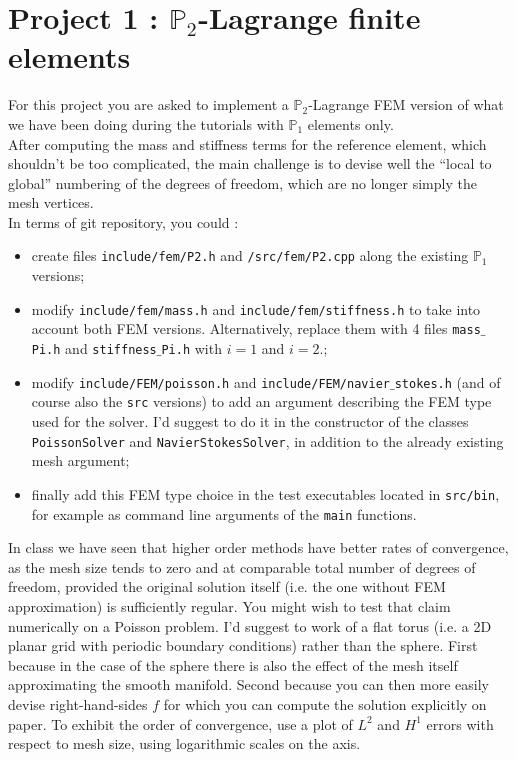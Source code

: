 \documentclass[11pt]{article}
\begin{document}
\pagebreak

\section*{Project 1 : $\mathbb{P}_2$-Lagrange finite elements}

For this project you are asked to implement a $\mathbb{P}_2$-Lagrange FEM version
of what we have been doing during the tutorials with $\mathbb{P}_1$ elements 
only.\\
After computing the mass and stiffness terms for the reference element, which
shouldn't be too complicated, the main challenge is to devise well the 
``local to global'' numbering of the degrees of freedom, which are no longer 
simply the mesh vertices.\\
In terms of git repository, you could : 
\begin{itemize}
\item create files {\tt include/fem/P2.h} and {\tt /src/fem/P2.cpp} along the
existing $\mathbb{P}_1$ versions;
\item modify {\tt include/fem/mass.h} and {\tt include/fem/stiffness.h} to take
into account both FEM versions. Alternatively, replace them with 4 files 
{\tt mass$\_$Pi.h}  and {\tt stiffness$\_$Pi.h} with $i = 1$ and $i = 2.$;
\item modify {\tt include/FEM/poisson.h} and {\tt include/FEM/navier$\_$stokes.h}
(and of course also the {\tt src} versions) to add an argument describing  
the FEM type used for the solver. I'd suggest to do it in the constructor of 
the classes {\tt PoissonSolver} and {\tt NavierStokesSolver}, in addition to 
the already existing mesh argument;
\item finally add this FEM type choice in the test executables 
located in {\tt src/bin}, for example
as command line arguments of the {\tt main} functions.
\end{itemize}

 In class we have seen that higher
order methods have better rates of convergence, as the mesh size tends to zero 
and at comparable total number of degrees of freedom, provided the original
solution itself 
(i.e. the one without FEM approximation) is sufficiently regular. You
might wish to test that claim numerically on a Poisson problem. I'd suggest to
work of a flat torus (i.e. a 2D planar grid with periodic boundary
conditions) rather than the sphere. First because in the case of the sphere 
there is also the effect of the mesh itself approximating the smooth manifold.
Second because you can then more easily devise right-hand-sides $f$ for which
you can compute the solution explicitly on paper. To exhibit the order of
convergence, use a plot of $L^2$ and $H^1$ errors with respect to mesh size, 
using logarithmic scales on the axis.
\end{document}
